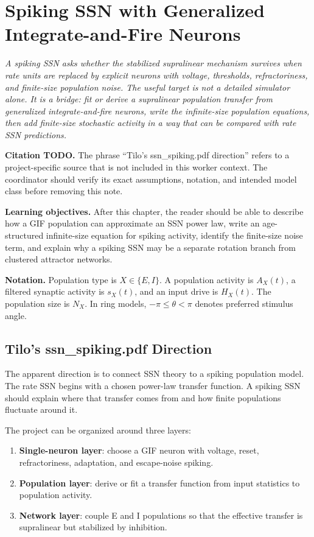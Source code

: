 \chapter{Spiking SSN with Generalized Integrate-and-Fire Neurons}
\label{ch:spiking-ssn-gif}

\textit{A spiking SSN asks whether the stabilized supralinear mechanism survives when rate units are replaced by explicit neurons with voltage, thresholds, refractoriness, and finite-size population noise. The useful target is not a detailed simulator alone. It is a bridge: fit or derive a supralinear population transfer from generalized integrate-and-fire neurons, write the infinite-size population equations, then add finite-size stochastic activity in a way that can be compared with rate SSN predictions.}

\noindent\textbf{Citation TODO.} The phrase ``Tilo's ssn\_spiking.pdf direction'' refers to a project-specific source that is not included in this worker context. The coordinator should verify its exact assumptions, notation, and intended model class before removing this note.

\noindent\textbf{Learning objectives.} After this chapter, the reader should be able to describe how a GIF population can approximate an SSN power law, write an age-structured infinite-size equation for spiking activity, identify the finite-size noise term, and explain why a spiking SSN may be a separate rotation branch from clustered attractor networks.

\noindent\textbf{Notation.} Population type is $X\in\{E,I\}$. A population activity is $A_X(t)$, a filtered synaptic activity is $s_X(t)$, and an input drive is $H_X(t)$. The population size is $N_X$. In ring models, $-\pi \le \theta < \pi$ denotes preferred stimulus angle.

\section{Tilo's ssn\_spiking.pdf Direction}
\label{sec:tilos-ssn-spiking-direction}

The apparent direction is to connect SSN theory to a spiking population model. The rate SSN begins with a chosen power-law transfer function. A spiking SSN should explain where that transfer comes from and how finite populations fluctuate around it.

The project can be organized around three layers:
%
\begin{enumerate}[leftmargin=*]
  \item \textbf{Single-neuron layer}: choose a GIF neuron with voltage, reset, refractoriness, adaptation, and escape-noise spiking.
  \item \textbf{Population layer}: derive or fit a transfer function from input statistics to population activity.
  \item \textbf{Network layer}: couple E and I populations so that the effective transfer is supralinear but stabilized by inhibition.
\end{enumerate}

